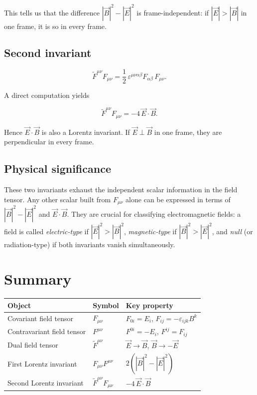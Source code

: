 This tells us that the difference $|\vec{B}|^2 - |\vec{E}|^2$ is frame-independent: if $|\vec{E}| > |\vec{B}|$ in one frame, it is so in every frame.

\subsection*{Second invariant}

\begin{equation}
\widetilde{F}^{\mu\nu}F_{\mu\nu} = \frac{1}{2}\,\varepsilon^{\mu\nu\alpha\beta}F_{\alpha\beta}\,F_{\mu\nu}.
\end{equation}

A direct computation yields

\begin{equation}
\boxed{\widetilde{F}^{\mu\nu}F_{\mu\nu} = -4\,\vec{E}\cdot\vec{B}.}
\end{equation}

Hence $\vec{E}\cdot\vec{B}$ is also a Lorentz invariant. If $\vec{E} \perp \vec{B}$ in one frame, they are perpendicular in every frame.

\subsection*{Physical significance}

These two invariants exhaust the independent scalar information in the field tensor. Any other scalar built from $F_{\mu\nu}$ alone can be expressed in terms of $|\vec{B}|^2 - |\vec{E}|^2$ and $\vec{E}\cdot\vec{B}$. They are crucial for classifying electromagnetic fields: a field is called \emph{electric-type} if $|\vec{E}|^2 > |\vec{B}|^2$, \emph{magnetic-type} if $|\vec{B}|^2 > |\vec{E}|^2$, and \emph{null} (or radiation-type) if both invariants vanish simultaneously.

\section{Summary}

\begin{table}[h]
\centering
\begin{tabular}{lll}
\toprule
\textbf{Object} & \textbf{Symbol} & \textbf{Key property} \\
\midrule
Covariant field tensor & $F_{\mu\nu}$ & $F_{0i}=E_i$,\; $F_{ij}=-\varepsilon_{ijk}B^k$ \\
Contravariant field tensor & $F^{\mu\nu}$ & $F^{0i}=-E_i$,\; $F^{ij}=F_{ij}$ \\
Dual field tensor & $\widetilde{F}^{\mu\nu}$ & $\vec{E}\to\vec{B}$, $\vec{B}\to-\vec{E}$ \\
First Lorentz invariant & $F_{\mu\nu}F^{\mu\nu}$ & $2(|\vec{B}|^2-|\vec{E}|^2)$ \\
Second Lorentz invariant & $\widetilde{F}^{\mu\nu}F_{\mu\nu}$ & $-4\,\vec{E}\cdot\vec{B}$ \\
\bottomrule
\end{tabular}
\end{table}

